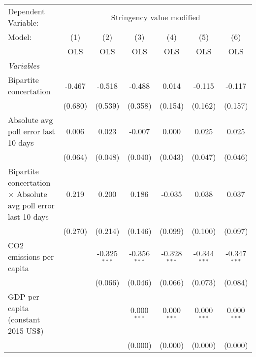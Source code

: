 
\begingroup
\centering
\begin{tabular}{lcccccc}
   \toprule
   Dependent Variable: & \multicolumn{6}{c}{Stringency value modified}\\
   Model:                                                                & (1)     & (2)            & (3)            & (4)            & (5)            & (6)\\  
                                                                         &  OLS    & OLS            & OLS            & OLS            & OLS            & OLS\\  
   \midrule
   \emph{Variables}\\
   Bipartite concertation                                                & -0.467  & -0.518         & -0.488         & 0.014          & -0.115         & -0.117\\   
                                                                         & (0.680) & (0.539)        & (0.358)        & (0.154)        & (0.162)        & (0.157)\\   
   Absolute avg poll error last 10 days                                  & 0.006   & 0.023          & -0.007         & 0.000          & 0.025          & 0.025\\   
                                                                         & (0.064) & (0.048)        & (0.040)        & (0.043)        & (0.047)        & (0.046)\\   
   Bipartite concertation $\times$ Absolute avg poll error last 10 days  & 0.219   & 0.200          & 0.186          & -0.035         & 0.038          & 0.037\\   
                                                                         & (0.270) & (0.214)        & (0.146)        & (0.099)        & (0.100)        & (0.097)\\   
   CO2 emissions per capita                                              &         & -0.325$^{***}$ & -0.356$^{***}$ & -0.328$^{***}$ & -0.344$^{***}$ & -0.347$^{***}$\\   
                                                                         &         & (0.066)        & (0.046)        & (0.066)        & (0.073)        & (0.084)\\   
   GDP per capita (constant 2015 US\$)                                   &         &                & 0.000$^{***}$  & 0.000$^{***}$  & 0.000$^{***}$  & 0.000$^{***}$\\   
                                                                         &         &                & (0.000)        & (0.000)        & (0.000)        & (0.000)\\   

\end{tabular}
